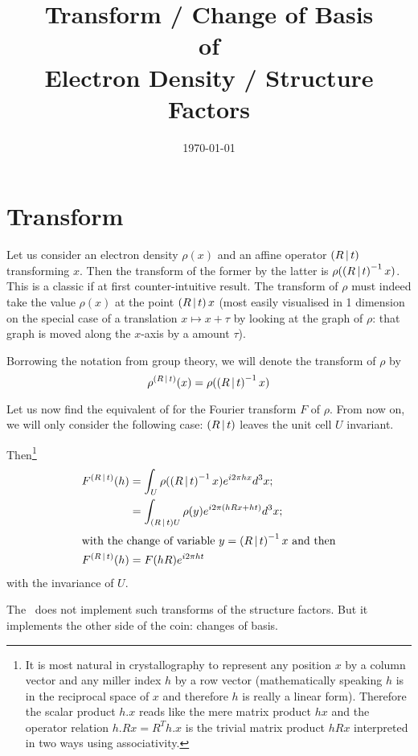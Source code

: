 \documentclass[11pt]{article}
\title{Transform / Change of Basis\\of\\Electron Density / Structure Factors}
\author{\lucjbourhis}
\date{\today}
\begin{document}
\maketitle

\section{Transform}

Let us consider an electron density $\rho(x)$ and an affine operator $\left( R\,\vert\, t \right)$ transforming $x$. Then the transform of the former by the latter is $\rho(\left( R\,\vert\, t \right)^{-1}x)$. This is a classic if at first counter-intuitive result. The transform of $\rho$ must indeed take the value $\rho(x)$ at the point $\left( R\,\vert\, t \right)x$ (most easily visualised in 1 dimension on the special case of a translation $x \mapsto x+\tau$ by looking at the graph of $\rho$: that graph is moved along the $x$-axis by a amount $\tau$).

Borrowing the notation from group theory, we will denote the transform of $\rho$ by
\begin{equation}
\rho^{\left( R\,\vert\, t \right)}(x) = \rho(\left( R\,\vert\, t \right)^{-1}x)
\label{rho:transform}
\end{equation}

Let us now find the equivalent of  for the Fourier transform $F$ of $\rho$. From now on, we will only consider the following case: $\left( R\,\vert\, t \right)$ leaves the unit cell $U$ invariant.

Then\footnote{It is most natural in crystallography to represent any position $x$ by a column vector and any miller index $h$ by a row vector (mathematically speaking $h$ is in the reciprocal space of $x$ and therefore $h$ is really a linear form). Therefore the scalar product $h.x$ reads like the mere matrix product $hx$ and the operator relation $h.Rx = R^Th.x$ is the trivial matrix product $hRx$ interpreted in two ways using associativity.}
\begin{align}
F^{\left( R\,\vert\, t \right)}(h) &= \int_U \rho(\left( R\,\vert\, t \right)^{-1}x) e^{i2\pi hx} d^3x ; \nonumber \\
&= \int_{\left( R\,\vert\, t \right)U} \rho(y) e^{i2\pi (hRx + ht)} d^3x ;\nonumber\\
\intertext{with the change of variable $y = \left( R\,\vert\, t \right)^{-1}x$ and then}
F^{\left( R\,\vert\, t \right)}(h) &= F(hR) e^{i2\pi ht}
\end{align}
with the invariance of $U$.

The \cctbx\ does not implement such transforms of the structure factors. But it implements the other side of the coin: changes of basis.
\end{document}
